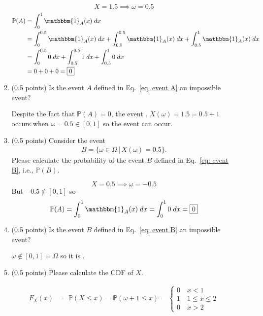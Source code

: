 \documentclass[11pt,letterpaper, leqno]{article}
\numberwithin{equation}{section}
\numberwithin{theorem}{section}
\numberwithin{lemma}{section}
\numberwithin{corollary}{section}
\numberwithin{definition}{section}
\numberwithin{proposition}{section}
\numberwithin{remark}{section}
\numberwithin{example}{section}
\renewcommand{\P}{\mathbb{P}}
\newcommand{\ind}{\mathbbm{1}}
\begin{document}
\begin{enumerate}
\begin{enumerate}
        \color{blue}
            \[X = 1.5 \implies \omega = 0.5\]
            \begin{align*}
                \P(A) &= \int_0^1 \ind_A(x) \; dx\\
                &= \int_0^{0.5} \ind_A(x) \; dx + \int_{0.5}^{0.5} \ind_A(x) \; dx + \int_{0.5}^1 \ind_A(x)\; dx\\
                &= \int_0^{0.5} 0 \; dx + \int_{0.5}^{0.5} 1 \; dx + \int_{0.5}^1 0\; dx\\
                &= 0 + 0 + 0 = \boxed{0}
            \end{align*}
        \color{black}

        \item (0.5 points) Is the event $A$ defined in Eq.~\eqref{eq: event A} an impossible event?

        \color{blue}
            Despite the fact that $\P(A) = 0$, the event . $X(\omega) = 1.5 = 0.5 + 1$ occurs when $\omega = 0.5 \in [0, 1]$ so the event can occur. 
        \color{black}

        \item (0.5 points) Consider the event
        \begin{align}\label{eq: event B}
            B=\{\omega\in\Omega \,\vert\, X(\omega)=0.5\}.
        \end{align}
        Please calculate the probability of the event $B$ defined in Eq.~\eqref{eq: event B}, i.e., $\mathbb{P}(B)$.
        
        \color{blue}
            \[X = 0.5 \implies \omega = -0.5\]
            But $-0.5 \not \in [0, 1]$ so 
            \[\P(A) = \int_0^1 \ind_A(x)\; dx = \int_0^1 0 \; dx = \boxed{0}\]
        \color{black}

        \item (0.5 points) Is the event $B$ defined in Eq.~\eqref{eq: event B} an impossible event?
        
        \color{blue}
            $\omega \not \in [0, 1] = \Omega$ so it is .
        \color{black}

        \item (0.5 points) Please calculate the CDF of $X$.
        
        \color{blue}
            \begin{align*}
                F_X(x) &= \P(X \leq x) = \P(\omega + 1 \leq x) = \begin{cases}
                    0 \quad x < 1\\
                    1 \quad 1 \leq x \leq 2\\
                    0 \quad x > 2
                \end{cases}
            \end{align*}
        \color{black}
    \end{enumerate}


\end{enumerate}
\end{document}
